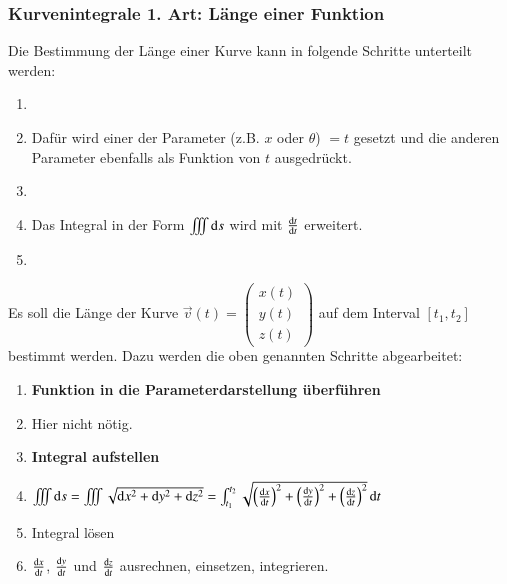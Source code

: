 \subsubsection{Kurvenintegrale 1. Art: Länge einer Funktion}
Die Bestimmung der Länge einer Kurve kann in folgende Schritte unterteilt werden:
\begin{enumerate}
    \item {}
    \item[] Dafür wird einer der Parameter (z.B. $x$ oder $\theta$) $=t$ gesetzt und die anderen Parameter ebenfalls als Funktion von $t$ ausgedrückt.
    \item {}
    \item[] Das Integral in der Form $ \iiint \mathop{} \! \mathrm{d} s $ wird mit $\frac{\mathop{} \! \mathrm{d} t}{\mathop{} \! \mathrm{d} t}$ erweitert.
    \item {}
\end{enumerate}

Es soll die Länge der Kurve $\vec{v}(t) = \begin{pmatrix}x(t)\\y(t)\\z(t)\end{pmatrix}$ auf dem Interval $[t_1, t_2]$ bestimmt werden.
Dazu werden die oben genannten Schritte abgearbeitet:
\begin{enumerate}
    \item \textbf{Funktion in die Parameterdarstellung überführen}
    \item[] Hier nicht nötig. %
    \item \textbf{Integral aufstellen} 
    \item[] $ \iiint \diff s = \iiint \sqrt{\diff x^2 + \diff y^2 + \diff z^2} = \int_{t_1}^{t_2} \sqrt{\left(\frac{\diff x}{\diff t}\right)^2 + \left(\frac{\diff y}{\diff t}\right)^2 + \left(\frac{\diff z}{\diff t}\right)^2} \diff t$
    \item Integral lösen
    \item[] $\frac{\mathop{} \! \mathrm{d} x}{\mathop{} \! \mathrm{d} t}$, $\frac{\mathop{} \! \mathrm{d} y}{\mathop{} \! \mathrm{d} t}$ und $\frac{\mathop{} \! \mathrm{d} z}{\mathop{} \! \mathrm{d} t}$ ausrechnen, einsetzen, integrieren.
\end{enumerate}

